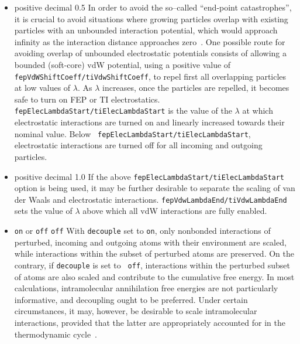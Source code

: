\begin{itemize}
\item
{}
{positive decimal}
{0.5} %
{In order to avoid the so--called ``end-point catastrophes'', it is crucial to
avoid situations where growing particles overlap with existing particles with
an unbounded interaction potential, which would approach infinity as the
interaction distance approaches zero~\cite{Beutler1994,Chipot2007}. One possible route for
avoiding overlap of unbounded electrostatic potentials consists of allowing a
bounded (soft-core) vdW potential, using a positive value of {\tt
fepVdWShiftCoeff/tiVdwShiftCoeff}, to repel first all overlapping particles at low values of
$\lambda$. As $\lambda$ increases, once the particles are repelled, it becomes
safe to turn on FEP or TI electrostatics. {\tt fepElecLambdaStart/tiElecLambdaStart} is the
value of the $\lambda$ at which electrostatic interactions are turned on and
linearly increased towards their nominal value. Below {\tt
fepElecLambdaStart/tiElecLambdaStart}, electrostatic interactions are turned off for all
incoming and outgoing particles.}

\item
{positive decimal}
{1.0} %
{If the above {\tt fepElecLambdaStart/tiElecLambdaStart} option is being used, it may be further
desirable to separate the scaling of van der Waals and electrostatic
interactions. {\tt fepVdwLambdaEnd/tiVdwLambdaEnd} sets the value of $\lambda$ above which
all vdW interactions are fully enabled.}

\item
{{\tt on} or {\tt off}} {{\tt off}} {With {\tt decouple} set to {\tt on},
only nonbonded interactions of perturbed, incoming and outgoing atoms with
their environment are scaled, while interactions within the subset of perturbed
atoms are preserved. On the contrary, if {\tt decouple} is set to {\tt
off}, interactions within the perturbed subset of atoms are also scaled and
contribute to the cumulative free energy. In most calculations, intramolecular
annihilation free energies are not particularly informative, and decoupling
ought to be preferred. Under certain circumstances, it may, however, be
desirable to scale intramolecular interactions, provided that the latter are
appropriately accounted for in the thermodynamic cycle~\cite{Chipot2007}. }


\end{itemize}
